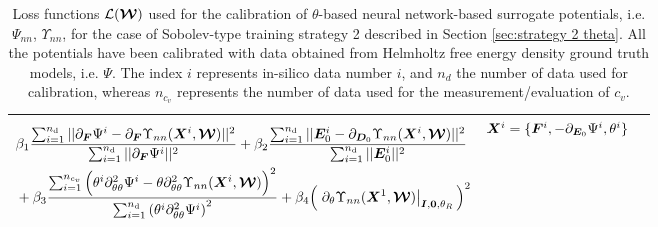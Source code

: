 \begin{table}[htbp!]
\begin{tabular}{c c c}
\begin{minipage}{0.75\textwidth}
\begin{equation*}
\begin{aligned}
			& \beta_1\frac{\sum_{i=1}^{n_{\text{d}}} \vert\vert \partial_{\boldsymbol{F}}\Psi^{i} - \partial_{\boldsymbol{F}} \Upsilon_{nn}(\boldsymbol{X}^i, \boldsymbol{\mathcal{W}}) \vert\vert^2}{\sum_{i=1}^{n_{\text{d}}} \vert\vert \partial_{\boldsymbol{F}}\Psi^{i} \vert\vert^2}  + \beta_2\frac{\sum_{i=1}^{n_{\text{d}}} \vert\vert \boldsymbol{E}_0^{i} - \partial_{\boldsymbol{D}_0} \Upsilon_{nn}(\boldsymbol{X}^i, \boldsymbol{\mathcal{W}}) \vert\vert^2}{\sum_{i=1}^{n_{\text{d}}} \vert\vert \boldsymbol{E}_0^{i} \vert\vert^2} \\
			&  + \beta_3\frac{\sum_{i=1}^{n_{c_v}} \Big(\theta^i\partial^2_{\theta\theta}\Psi^i- \theta\partial^2_{\theta\theta}\Upsilon_{nn}(\boldsymbol{X}^i, \boldsymbol{\mathcal{W}}) \Big)^2}{\sum_{i=1}^{n_{\text{d}}}   \left(\theta^i\partial^2_{\theta\theta}\Psi^i\right)^2} + \beta_4\Big(\left. \partial_{\theta}\Upsilon_{nn}(\boldsymbol{X}^1,\boldsymbol{\mathcal{W}})\right\vert_{\boldsymbol{I},\boldsymbol{0},\theta_R}\Big)^2
			\end{aligned}
			\end{equation*}
		\end{minipage}  & $\boldsymbol{X}^i=\{\boldsymbol{F}^i, -\partial_{\boldsymbol{E}_0}\Psi^i, \theta^i\}$ 	\\
	\midrule
		
		
	\end{tabular}
	\caption{Loss functions $\mathcal{L}(\boldsymbol{\mathcal{W}})$ used for the calibration of $\theta$-based neural network-based surrogate potentials, i.e. $\Psi_{nn}$,  $\Upsilon_{nn}$, for the case of Sobolev-type training strategy 2 described in Section \ref{sec:strategy 2 theta}. All the potentials have been calibrated with data obtained from Helmholtz free energy density ground truth models, i.e. $\Psi$. The index $i$ represents in-silico data number $i$, and $n_d$ the number of data used for calibration, whereas $n_{c_v}$ represents the number of data used for the measurement/evaluation of $c_v$.}
	\label{table: sobolev type 2 theta}
\end{table}




